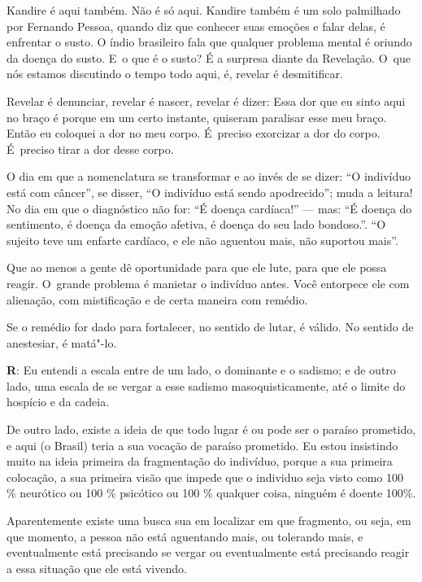  

Kandire é aqui também. Não é só aqui. Kandire também é um solo
palmilhado por Fernando Pessoa, quando diz que conhecer suas emoções e
falar delas, é enfrentar o susto. O índio brasileiro fala que qualquer
problema mental é oriundo da doença do susto. E~o que é o susto? É a
surpresa diante da Revelação. O~que nós estamos discutindo o tempo todo
aqui, é, revelar é desmitificar.

 

Revelar é denunciar, revelar é nascer, revelar é dizer: Essa dor que eu
sinto aqui no braço é porque em um certo instante, quiseram paralisar
esse meu braço. Então eu coloquei a dor no meu corpo. É~preciso
exorcizar a dor do corpo. É~preciso tirar a dor desse corpo.

 

O dia em que a nomenclatura se transformar e ao invés de se dizer: ``O
indivíduo está com câncer'', se disser, ``O indivíduo está sendo
apodrecido''; muda a leitura! No dia em que o diagnóstico não for: ``É
doença cardíaca!'' --- mas: ``É doença do sentimento, é doença da emoção
afetiva, é doença do seu lado bondoso.''. ``O sujeito teve um enfarte
cardíaco, e ele não aguentou mais, não suportou mais''.

Que ao menos a gente dê oportunidade para que ele lute, para que ele
possa reagir. O~grande problema é manietar o indivíduo antes. Você
entorpece ele com alienação, com mistificação e de certa maneira com
remédio.

 

Se o remédio for dado para fortalecer, no sentido de lutar, é válido. No
sentido de anestesiar, é matá"-lo.

 

\textbf{R}: Eu entendi a escala entre de um lado, o dominante e o
sadismo; e de outro lado, uma escala de se vergar a esse sadismo
masoquisticamente, até o limite do hospício e da cadeia.

 

De outro lado, existe a ideia de que todo lugar é ou pode ser o paraíso
prometido, e aqui (o Brasil) teria a sua vocação de paraíso prometido.
Eu estou insistindo muito na ideia primeira da fragmentação do
indivíduo, porque a sua primeira colocação, a sua primeira visão que
impede que o individuo seja visto como 100 \% neurótico ou 100 \%
psicótico ou 100 \% qualquer coisa, ninguém é doente 100\%.

 

Aparentemente existe uma busca sua em localizar em que fragmento, ou
seja, em que momento, a pessoa não está aguentando mais, ou tolerando
mais, e eventualmente está precisando se vergar ou eventualmente está
precisando reagir a essa situação que ele está vivendo.

